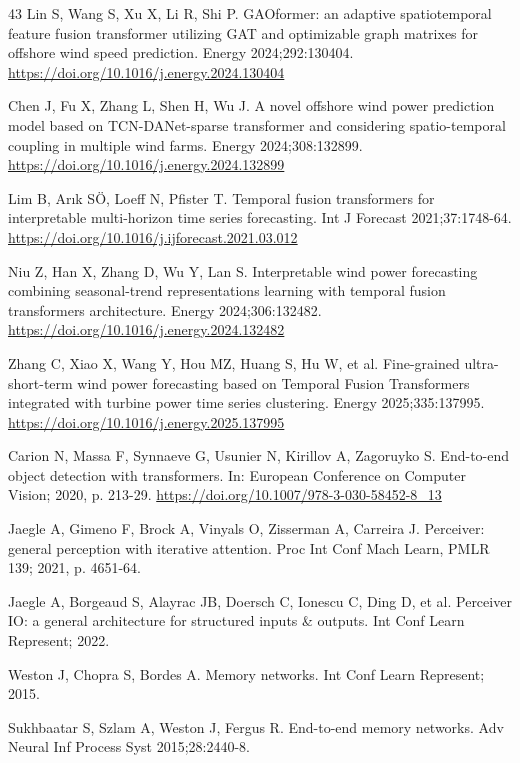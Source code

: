 \begin{thebibliography}{43}
Lin S, Wang S, Xu X, Li R, Shi P. GAOformer: an adaptive spatiotemporal feature fusion transformer utilizing GAT and optimizable graph matrixes for offshore wind speed prediction. Energy 2024;292:130404. \url{https://doi.org/10.1016/j.energy.2024.130404}

Chen J, Fu X, Zhang L, Shen H, Wu J. A novel offshore wind power prediction model based on TCN-DANet-sparse transformer and considering spatio-temporal coupling in multiple wind farms. Energy 2024;308:132899. \url{https://doi.org/10.1016/j.energy.2024.132899}

Lim B, Arık SÖ, Loeff N, Pfister T. Temporal fusion transformers for interpretable multi-horizon time series forecasting. Int J Forecast 2021;37:1748-64. \url{https://doi.org/10.1016/j.ijforecast.2021.03.012}

Niu Z, Han X, Zhang D, Wu Y, Lan S. Interpretable wind power forecasting combining seasonal-trend representations learning with temporal fusion transformers architecture. Energy 2024;306:132482. \url{https://doi.org/10.1016/j.energy.2024.132482}

Zhang C, Xiao X, Wang Y, Hou MZ, Huang S, Hu W, et al. Fine-grained ultra-short-term wind power forecasting based on Temporal Fusion Transformers integrated with turbine power time series clustering. Energy 2025;335:137995. \url{https://doi.org/10.1016/j.energy.2025.137995}

Carion N, Massa F, Synnaeve G, Usunier N, Kirillov A, Zagoruyko S. End-to-end object detection with transformers. In: European Conference on Computer Vision; 2020, p. 213-29. \url{https://doi.org/10.1007/978-3-030-58452-8_13}

Jaegle A, Gimeno F, Brock A, Vinyals O, Zisserman A, Carreira J. Perceiver: general perception with iterative attention. Proc Int Conf Mach Learn, PMLR 139; 2021, p. 4651-64.

Jaegle A, Borgeaud S, Alayrac JB, Doersch C, Ionescu C, Ding D, et al. Perceiver IO: a general architecture for structured inputs \& outputs. Int Conf Learn Represent; 2022.

Weston J, Chopra S, Bordes A. Memory networks. Int Conf Learn Represent; 2015.

Sukhbaatar S, Szlam A, Weston J, Fergus R. End-to-end memory networks. Adv Neural Inf Process Syst 2015;28:2440-8.


\end{thebibliography}
